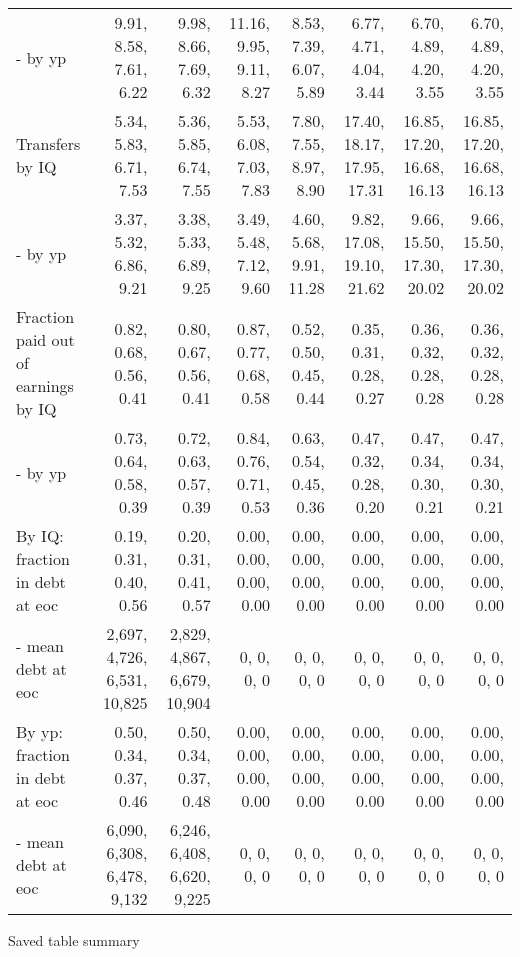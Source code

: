 \begin{tabular}{lrrrrrrr}
- by yp & 9.91, 8.58, 7.61, 6.22  & 9.98, 8.66, 7.69, 6.32  & 11.16, 9.95, 9.11, 8.27  & 8.53, 7.39, 6.07, 5.89  & 6.77, 4.71, 4.04, 3.44  & 6.70, 4.89, 4.20, 3.55  & 6.70, 4.89, 4.20, 3.55  \\ 
Transfers by IQ & 5.34, 5.83, 6.71, 7.53  & 5.36, 5.85, 6.74, 7.55  & 5.53, 6.08, 7.03, 7.83  & 7.80, 7.55, 8.97, 8.90  & 17.40, 18.17, 17.95, 17.31  & 16.85, 17.20, 16.68, 16.13  & 16.85, 17.20, 16.68, 16.13  \\ 
- by yp & 3.37, 5.32, 6.86, 9.21  & 3.38, 5.33, 6.89, 9.25  & 3.49, 5.48, 7.12, 9.60  & 4.60, 5.68, 9.91, 11.28  & 9.82, 17.08, 19.10, 21.62  & 9.66, 15.50, 17.30, 20.02  & 9.66, 15.50, 17.30, 20.02  \\ 
Fraction paid out of earnings by IQ & 0.82, 0.68, 0.56, 0.41  & 0.80, 0.67, 0.56, 0.41  & 0.87, 0.77, 0.68, 0.58  & 0.52, 0.50, 0.45, 0.44  & 0.35, 0.31, 0.28, 0.27  & 0.36, 0.32, 0.28, 0.28  & 0.36, 0.32, 0.28, 0.28  \\ 
- by yp & 0.73, 0.64, 0.58, 0.39  & 0.72, 0.63, 0.57, 0.39  & 0.84, 0.76, 0.71, 0.53  & 0.63, 0.54, 0.45, 0.36  & 0.47, 0.32, 0.28, 0.20  & 0.47, 0.34, 0.30, 0.21  & 0.47, 0.34, 0.30, 0.21  \\ 
By IQ: fraction in debt at eoc & 0.19, 0.31, 0.40, 0.56  & 0.20, 0.31, 0.41, 0.57  & 0.00, 0.00, 0.00, 0.00  & 0.00, 0.00, 0.00, 0.00  & 0.00, 0.00, 0.00, 0.00  & 0.00, 0.00, 0.00, 0.00  & 0.00, 0.00, 0.00, 0.00  \\ 
- mean debt at eoc & 2,697, 4,726, 6,531, 10,825  & 2,829, 4,867, 6,679, 10,904  & 0, 0, 0, 0  & 0, 0, 0, 0  & 0, 0, 0, 0  & 0, 0, 0, 0  & 0, 0, 0, 0  \\ 
By yp: fraction in debt at eoc & 0.50, 0.34, 0.37, 0.46  & 0.50, 0.34, 0.37, 0.48  & 0.00, 0.00, 0.00, 0.00  & 0.00, 0.00, 0.00, 0.00  & 0.00, 0.00, 0.00, 0.00  & 0.00, 0.00, 0.00, 0.00  & 0.00, 0.00, 0.00, 0.00  \\ 
- mean debt at eoc & 6,090, 6,308, 6,478, 9,132  & 6,246, 6,408, 6,620, 9,225  & 0, 0, 0, 0  & 0, 0, 0, 0  & 0, 0, 0, 0  & 0, 0, 0, 0  & 0, 0, 0, 0  \\ 
\hline
\end{tabular}%
Saved table summary

